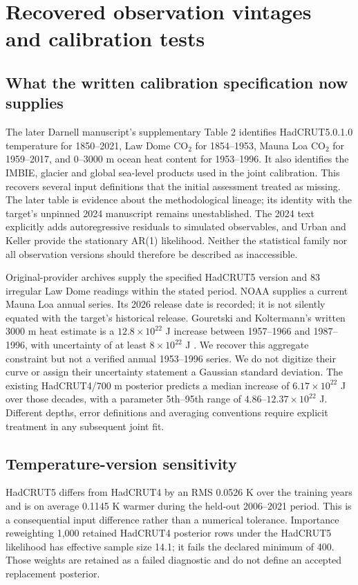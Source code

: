 \section{Recovered observation vintages and calibration tests}
\subsection{What the written calibration specification now supplies}
The later Darnell manuscript's supplementary Table 2\cite{darnell2025} identifies HadCRUT5.0.1.0
temperature for 1850--2021, Law Dome CO$_2$ for 1854--1953, Mauna Loa CO$_2$ for
1959--2017, and 0--3000 m ocean heat content for 1953--1996. It also identifies
the IMBIE, glacier and global sea-level products used in the joint calibration.
This recovers several input definitions that the initial assessment treated as
missing. The later table is evidence about the methodological lineage; its
identity with the target's unpinned 2024 manuscript remains unestablished.
The 2024 text explicitly adds autoregressive residuals to simulated observables,
and Urban and Keller provide the stationary AR(1) likelihood\cite{urban}.
Neither the statistical family nor all observation versions should therefore
be described as inaccessible.

Original-provider archives supply the specified HadCRUT5 version and 83
irregular Law Dome readings within the stated period. NOAA supplies a current
Mauna Loa annual series. Its 2026 release date is recorded; it is not silently
equated with the target's historical release. Gouretski and Koltermann's
written 3000 m heat estimate is a $12.8\times10^{22}$ J increase between
1957--1966 and 1987--1996, with uncertainty of at least $8\times10^{22}$ J
\cite{gouretski}. We recover this aggregate constraint but not a verified annual
1953--1996 series. We do not digitize their curve or assign their uncertainty
statement a Gaussian standard deviation. The existing HadCRUT4/700 m posterior
predicts a median increase of $6.17\times10^{22}$ J over those decades, with a
parameter 5th--95th range of $4.86$--$12.37\times10^{22}$ J. Different depths,
error definitions and averaging conventions require explicit treatment in any
subsequent joint fit.

\subsection{Temperature-version sensitivity}
HadCRUT5 differs from HadCRUT4 by an RMS 0.0526 K over the training years and
is on average 0.1145 K warmer during the held-out 2006--2021 period. This is a
consequential input difference rather than a numerical tolerance. Importance
reweighting 1,000 retained HadCRUT4 posterior rows under the HadCRUT5 likelihood
has effective sample size 14.1; it fails the declared minimum of 400. Those
weights are retained as a failed diagnostic and do not define an accepted
replacement posterior.

